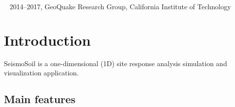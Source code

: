 \documentclass[11pt,letterpaper]{article}
\begin{document}
\begin{center}
	\textcopyright~ 2014--2017, GeoQuake Research Group, California Institute of Technology
\end{center}

\newpage
\tableofcontents

\newpage
\section{Introduction}

SeismoSoil is a one-dimensional (1D) site response analysis simulation and visualization application.

\subsection{Main features}
\end{document}
